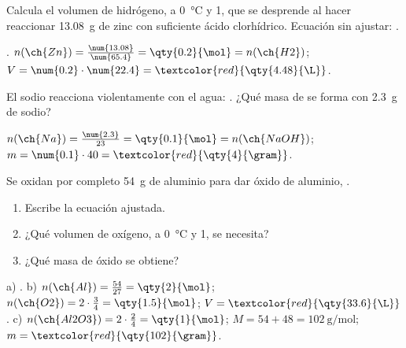 \begin{exercise}
    Calcula el volumen de hidrógeno, a \qty{0}{\celsius} y \qty{1}{\atm}, que se desprende al hacer reaccionar \qty{13.08}{\gram} de zinc con suficiente ácido clorhídrico. Ecuación sin ajustar: .
    \begin{solu}
        . \(n(\ch{Zn}) = \frac{\num{13.08}}{\num{65.4}} = \qty{0.2}{\mol} = n(\ch{H2})\); \(V = \num{0.2} \cdot \num{22.4} = \textcolor{red}{\qty{4.48}{\L}}\).
    \end{solu}
\end{exercise}

\begin{exercise}
    El sodio reacciona violentamente con el agua: . ¿Qué masa de  se forma con \qty{2.3}{\gram} de sodio?
    \begin{solu}
        \(n(\ch{Na}) = \frac{\num{2.3}}{23} = \qty{0.1}{\mol} = n(\ch{NaOH})\); \(m = \num{0.1} \cdot 40 = \textcolor{red}{\qty{4}{\gram}}\).
    \end{solu}
\end{exercise}

\begin{exercise}
    Se oxidan por completo \qty{54}{\gram} de aluminio para dar óxido de aluminio, .
    \begin{enumerate}[label=\alph*)]
        \item Escribe la ecuación ajustada.
        \item ¿Qué volumen de oxígeno, a \qty{0}{\celsius} y \qty{1}{\atm}, se necesita?
        \item ¿Qué masa de óxido se obtiene?
    \end{enumerate}
    \begin{solu}
        a) .
        b) \(n(\ch{Al}) = \frac{54}{27} = \qty{2}{\mol}\); \(n(\ch{O2}) = 2 \cdot \frac{3}{4} = \qty{1.5}{\mol}\); \(V = \textcolor{red}{\qty{33.6}{\L}}\).
        c) \(n(\ch{Al2O3}) = 2 \cdot \frac{2}{4} = \qty{1}{\mol}\); \(M = 54 + 48 = \qty{102}{\gram\per\mol}\); \(m = \textcolor{red}{\qty{102}{\gram}}\).
    \end{solu}
\end{exercise}


